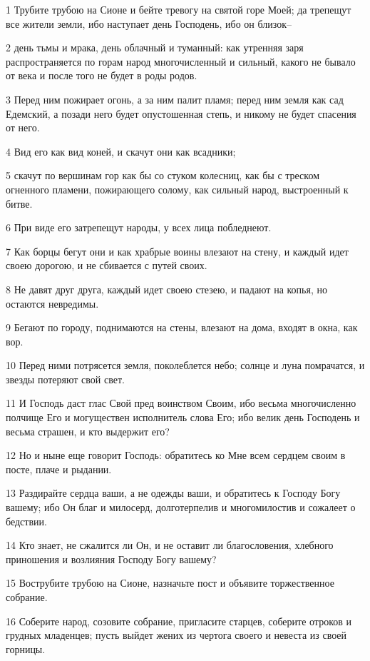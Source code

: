 \par 1 Трубите трубою на Сионе и бейте тревогу на святой горе Моей; да трепещут все жители земли, ибо наступает день Господень, ибо он близок--
\par 2 день тьмы и мрака, день облачный и туманный: как утренняя заря распространяется по горам народ многочисленный и сильный, какого не бывало от века и после того не будет в роды родов.
\par 3 Перед ним пожирает огонь, а за ним палит пламя; перед ним земля как сад Едемский, а позади него будет опустошенная степь, и никому не будет спасения от него.
\par 4 Вид его как вид коней, и скачут они как всадники;
\par 5 скачут по вершинам гор как бы со стуком колесниц, как бы с треском огненного пламени, пожирающего солому, как сильный народ, выстроенный к битве.
\par 6 При виде его затрепещут народы, у всех лица побледнеют.
\par 7 Как борцы бегут они и как храбрые воины влезают на стену, и каждый идет своею дорогою, и не сбивается с путей своих.
\par 8 Не давят друг друга, каждый идет своею стезею, и падают на копья, но остаются невредимы.
\par 9 Бегают по городу, поднимаются на стены, влезают на дома, входят в окна, как вор.
\par 10 Перед ними потрясется земля, поколеблется небо; солнце и луна помрачатся, и звезды потеряют свой свет.
\par 11 И Господь даст глас Свой пред воинством Своим, ибо весьма многочисленно полчище Его и могуществен исполнитель слова Его; ибо велик день Господень и весьма страшен, и кто выдержит его?
\par 12 Но и ныне еще говорит Господь: обратитесь ко Мне всем сердцем своим в посте, плаче и рыдании.
\par 13 Раздирайте сердца ваши, а не одежды ваши, и обратитесь к Господу Богу вашему; ибо Он благ и милосерд, долготерпелив и многомилостив и сожалеет о бедствии.
\par 14 Кто знает, не сжалится ли Он, и не оставит ли благословения, хлебного приношения и возлияния Господу Богу вашему?
\par 15 Вострубите трубою на Сионе, назначьте пост и объявите торжественное собрание.
\par 16 Соберите народ, созовите собрание, пригласите старцев, соберите отроков и грудных младенцев; пусть выйдет жених из чертога своего и невеста из своей горницы.
